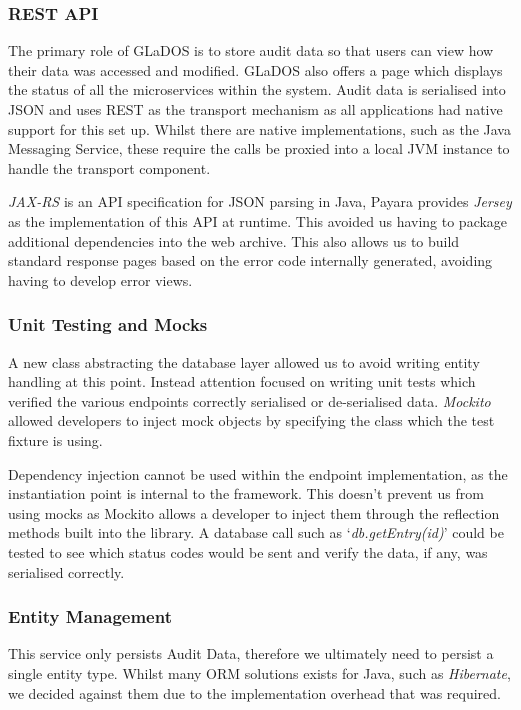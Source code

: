 \subsubsection{REST API}
\par
The primary role of GLaDOS is to store audit data so that users can view how their data was accessed and modified. GLaDOS also offers a page which displays the status of all the microservices within the system. Audit data is serialised into JSON and uses REST as the transport mechanism as all applications had native support for this set up. Whilst there are native implementations, such as the Java Messaging Service, these require the calls be proxied into a local JVM instance to handle the transport component.

\par
\textit{JAX-RS} is an API specification for JSON parsing in Java, Payara provides \textit{Jersey} as the implementation of this API at runtime. This avoided us having to package additional dependencies into the web archive. This also allows us to build standard response pages based on the error code internally generated, avoiding having to develop error views.        

\subsubsection{Unit Testing and Mocks}
\par
A new class abstracting the database layer allowed us to avoid writing entity handling at this point. Instead attention focused on writing unit tests which verified the various endpoints correctly serialised or de-serialised data. \textit{Mockito}\cite{Mockito} allowed developers to inject mock objects by specifying the class which the test fixture is using.

\par
Dependency injection cannot be used within the endpoint implementation, as the instantiation point is internal to the framework. This doesn't prevent us from using mocks as Mockito allows a developer to inject them through the reflection methods built into the library. A database call such as `\textit{db.getEntry(id)}' could be tested to see which status codes would be sent and verify the data, if any, was serialised correctly.

\subsubsection{Entity Management}
This service only persists Audit Data, therefore we ultimately need to persist a single entity type. Whilst many ORM solutions exists for Java, such as \textit{Hibernate}, we decided against them due to the implementation overhead that was required.

